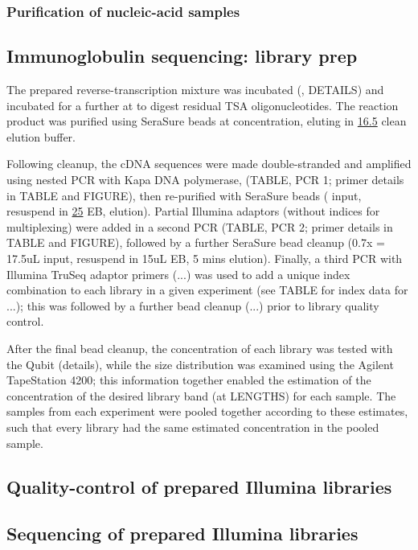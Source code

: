 \subsubsection{Purification of nucleic-acid samples}

\subsection{Immunoglobulin sequencing: library prep} 
The prepared reverse-transcription mixture was incubated  (, DETAILS) and incubated for a further  at  to digest residual TSA oligonucleotides. The reaction product was purified using SeraSure beads at  concentration, eluting in \ul{16.5} clean elution buffer. %

Following cleanup, the cDNA sequences were made double-stranded and amplified using nested PCR with Kapa DNA polymerase, %
(TABLE, PCR 1; primer details in TABLE and FIGURE), then re-purified with SeraSure beads ( input, resuspend in \ul{25} EB,  elution). Partial Illumina adaptors (without indices for multiplexing) were added in a second PCR (TABLE, PCR 2; primer details in TABLE and FIGURE), followed by a further SeraSure bead cleanup (0.7x = 17.5uL input, resuspend in 15uL EB, 5 mins elution). Finally, a third PCR with Illumina TruSeq adaptor primers (...) was used to add a unique index combination to each library in a given experiment (see TABLE for index data for ...); this was followed by a further bead cleanup (...) prior to library quality control.

After the final bead cleanup, the concentration of each library was tested with the Qubit (details), while the size distribution was examined using the Agilent TapeStation 4200; this information together enabled the estimation of the concentration of the desired library band (at LENGTHS) for each sample. The samples from each experiment were pooled together according to these estimates, such that every library had the same estimated concentration in the pooled sample. 


\subsection{Quality-control of prepared Illumina libraries}

\subsection{Sequencing of prepared Illumina libraries}
